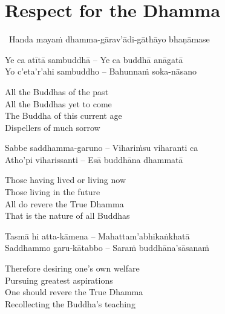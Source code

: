 \suttaRef{[Dhp 153-154]}


\section{Respect for the Dhamma}
\label{respect-for-the-dhamma}

\begin{leader}
  \anglebracketleft\ \hspace{-0.5mm}Handa mayaṁ dhamma-gārav'ādi-gāthāyo bhaṇāmase \hspace{-0.5mm}\anglebracketright\
\end{leader}

\begin{verses}
  Ye ca atītā sambuddhā – Ye ca buddhā anāgatā\\
  Yo c'eta'r'ahi sambuddho – Bahunnaṁ soka-nāsano
\end{verses}

\begin{english-verses}
  All the Buddhas of the past\\
  All the Buddhas yet to come\\
  The Buddha of this current age\\
  Dispellers of much sorrow
\end{english-verses}

\begin{verses}
  Sabbe saddhamma-garuno – Vihariṁsu viharanti ca\\
  Atho'pi viharissanti – Esā buddhāna dhammatā
\end{verses}

\begin{english-verses}
  Those having lived or living now\\
  Those living in the future\\
  All do revere the True Dhamma\\
  That is the nature of all Buddhas
\end{english-verses}

\begin{verses}
  Tasmā hi atta-kāmena – Mahattam'abhikaṅkhatā\\
  Saddhammo garu-kātabbo – Saraṁ buddhāna'sāsanaṁ
\end{verses}

\begin{english-verses}
  Therefore desiring one's own welfare\\
  Pursuing greatest aspirations\\
  One should revere the True Dhamma\\
  Recollecting the Buddha's teaching
\end{english-verses}

